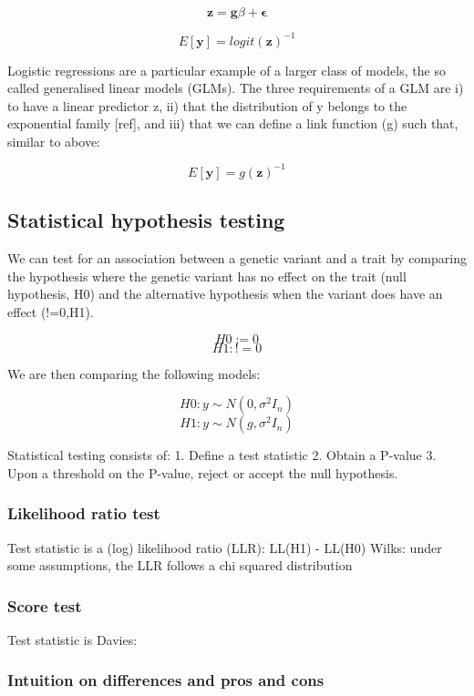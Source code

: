  \[ \mathbf{z} = \mathbf{g}\beta + \boldsymbol{\epsilon} \]

\[ E[\mathbf{y}] = logit(\mathbf{z})^{-1} \]

Logistic regressions are a particular example of a larger class of models, the so called generalised linear models (GLMs). The three requirements of a GLM are i) to have a linear predictor z, ii) that the distribution of y belongs to the exponential family [ref], and iii) that we can define a link function (g) such that, similar to above:

 \[ E[\mathbf{y}] = g(\mathbf{z})^{-1} \]

\subsection{Statistical hypothesis testing}

We can test for an association between a genetic variant and a trait by comparing the hypothesis where the genetic variant has no effect on the trait (null hypothesis, H0) and the alternative hypothesis when the variant does have an effect (!=0,H1).


 \[ H0:=0 \]
 \[ H1:!=0 \]

We are then comparing the following models:
 
 \[H0: y \sim N(0, \sigma^{2} I_n) \]
 \[H1: y \sim N(g,\sigma^{2} I_{n}) \]

Statistical testing consists of:
1. Define a test statistic
2. Obtain a P-value
3. Upon a threshold on the P-value, reject or accept the null hypothesis. 


\subsubsection{Likelihood ratio test}

Test statistic is a (log) likelihood ratio (LLR): LL(H1) - LL(H0)
Wilks: under some assumptions, the LLR follows a chi squared distribution

\subsubsection{Score test}

Test statistic is 
Davies:

\subsubsection{Intuition on differences and pros and cons}

